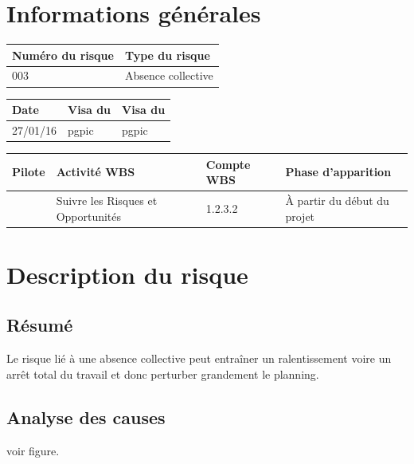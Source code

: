 \section*{Informations générales}
 
\begin{table}[h]
\centering
	\begin{tabularx}{16.8cm}{|X|X|}
	\hline
	\rowcolor{gray!40} Numéro du risque & Type du risque \\
	\hline
	003 & Absence collective \\
	\hline
	\end{tabularx}
\end{table}

\begin{table}[h]
\centering
	\begin{tabularx}{12.8cm}{|X|X|X|}
	\hline
	\rowcolor{gray!40} Date & Visa du \RQ & Visa du \CP \\
	\hline
	 27/01/16 & pgpic & pgpic \\
	\hline
	\end{tabularx}
\end{table}

\begin{table}[h]
\centering
	\begin{tabularx}{12.8cm}{|X|X|X|X|}
	\hline
	\rowcolor{gray!40} Pilote & Activité WBS & Compte WBS & Phase d'apparition \\
	\hline
	 \Pierre & Suivre les Risques et Opportunités & 1.2.3.2 & À partir du début du projet \\
	\hline
	\end{tabularx}
\end{table}

\section*{Description du risque}

\subsection*{Résumé}
	Le risque lié à une absence collective peut entraîner un ralentissement voire un arrêt total du travail et donc perturber grandement le planning.
	
\subsection*{Analyse des causes}
	voir figure.

